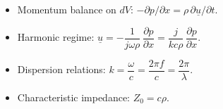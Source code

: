 \begin{tcolorbox}[colback=gray!5,colframe=gray!50!black,title=Key points]
\begin{itemize}
\item Momentum balance on \(dV\): \(-\partial p/\partial x=\rho\,\partial\underline{u}/\partial t\).
\item Harmonic regime: \(\underline{u}=-\dfrac{1}{j\omega\rho}\,\dfrac{\partial p}{\partial x}=\dfrac{j}{k c \rho}\,\dfrac{\partial p}{\partial x}\).
\item Dispersion relations: \(k=\dfrac{\omega}{c}=\dfrac{2\pi f}{c}=\dfrac{2\pi}{\lambda}\).
\item Characteristic impedance: \(Z_0=c\rho\).
\end{itemize}
\end{tcolorbox}